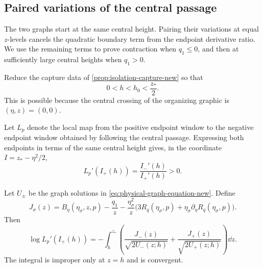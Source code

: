 \subsection{Paired variations of the central passage}
\label{sec:paired-variation}

The two graphs start at the same central height. Pairing their variations
at equal \(z\)-levels cancels the quadratic boundary term from the
endpoint derivative ratio. We use the remaining terms to prove
contraction when \(q_1\le0\), and then at sufficiently large central
heights when \(q_1>0\).

Reduce the capture data of \cref{prop:isolation-capture-new} so that
\begin{equation}
\label{eq:small-central-height-new}
 0<h<h_0<\frac{z_*}{2}.
\end{equation}
This is possible because the central crossing of the organizing graphic is
$(\eta,z)=(0,0)$.

Let $L_p$ denote the local map from the positive endpoint window to the
negative endpoint window obtained by following the central passage.
Expressing both endpoints in terms of the same central height gives,
in the coordinate $I=z_*-\eta^2/2$,
\begin{equation}
\label{eq:local-map-derivative-new}
 L_p'(I_+(h))=\frac{I_-'(h)}{I_+'(h)}>0.
\end{equation}

\begin{lemma}
\label{lem:paired-variation-identity-new}
Let $U_\pm$ be the graph solutions in
\eqref{eq:physical-graph-equation-new}.  Define
\begin{equation}
\label{eq:J-sigma-new}
 J_\sigma(z)=B_\eta(\eta_\sigma,z,p)-\frac{q_1}{z}
 -\frac{\eta_\sigma^2}{z}
  \bigl(3R_q(\eta_\sigma,p)
       +\eta_\sigma\partial_\eta R_q(\eta_\sigma,p)\bigr).
\end{equation}
Then
\begin{equation}
\label{eq:paired-log-derivative-new}
 \log L_p'(I_+(h))
 =-\int_h^{z_*}
 \left(\frac{J_-(z)}{\sqrt{2U_-(z;h)}}
       +\frac{J_+(z)}{\sqrt{2U_+(z;h)}}\right)\dd z.
\end{equation}
The integral is improper only at $z=h$ and is convergent.
\end{lemma}

